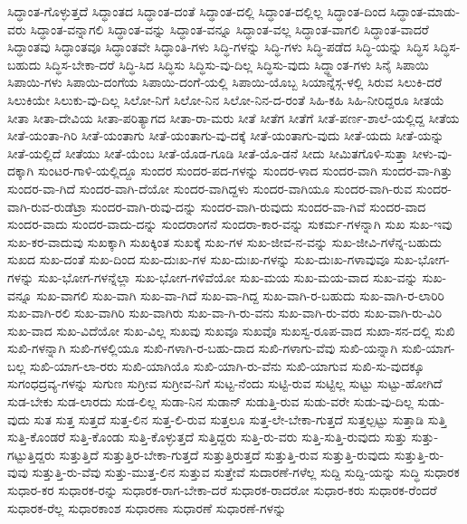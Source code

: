 {ಸಿದ್ಧಾಂತ-ಗೊಳ್ಳುತ್ತದೆ
ಸಿದ್ಧಾಂತದ
ಸಿದ್ಧಾಂತ-ದಂತೆ
ಸಿದ್ಧಾಂತ-ದಲ್ಲಿ
ಸಿದ್ಧಾಂತ-ದಲ್ಲಿಲ್ಲ
ಸಿದ್ಧಾಂತ-ದಿಂದ
ಸಿದ್ಧಾಂತ-ಮಾಡು-ವರು
ಸಿದ್ಧಾಂತ-ವನ್ನಾಗಲಿ
ಸಿದ್ಧಾಂತ-ವನ್ನು
ಸಿದ್ಧಾಂತ-ವನ್ನೂ
ಸಿದ್ಧಾಂತ-ವಲ್ಲ
ಸಿದ್ಧಾಂತ-ವಾಗಲಿ
ಸಿದ್ಧಾಂತ-ವಾದರೆ
ಸಿದ್ಧಾಂತವು
ಸಿದ್ಧಾಂತವೂ
ಸಿದ್ಧಾಂತವೇ
ಸಿದ್ಧಾಂತಿ-ಗಳು
ಸಿದ್ಧಿ-ಗಳನ್ನು
ಸಿದ್ಧಿ-ಗಳು
ಸಿದ್ಧಿ-ಪಡೆದ
ಸಿದ್ಧಿ-ಯನ್ನು
ಸಿದ್ಧಿಸ
ಸಿದ್ಧಿಸ-ಬಹುದು
ಸಿದ್ಧಿಸ-ಬೇಕಾ-ದರೆ
ಸಿದ್ಧಿ-ಸಿದ
ಸಿದ್ಧಿಸು
ಸಿದ್ಧಿಸು-ವು-ದಿಲ್ಲ
ಸಿದ್ಧಿಸು-ವುದು
ಸಿದ್ಧ್ದಾಂತ-ಗಳು
ಸಿನೈ
ಸಿಪಾಯಿ
ಸಿಪಾಯಿ-ಗಳು
ಸಿಪಾಯಿ-ದಂಗೆಯ
ಸಿಪಾಯಿ-ದಂಗೆ-ಯಲ್ಲಿ
ಸಿಪಾಯಿ-ಯೊಬ್ಬ
ಸಿಯಾನ್ನೆಸ್ಗ-ಳಲ್ಲಿ
ಸಿರುವ
ಸಿಲುಕಿ-ದರೆ
ಸಿಲುಕಿಯೇ
ಸಿಲುಕು-ವು-ದಿಲ್ಲ
ಸಿಲೋ-ನಿಗೆ
ಸಿಲೋ-ನಿನ
ಸಿಲೋ-ನಿನ-ದ-ರಂತೆ
ಸಿಹಿ-ಕಹಿ
ಸಿಹಿ-ನೀರಿದ್ದರೂ
ಸೀತಯೆ
ಸೀತಾ
ಸೀತಾ-ದೇವಿಯ
ಸೀತಾ-ಪರಿತ್ಯಾಗದ
ಸೀತಾ-ರಾ-ಮರು
ಸೀತೆ
ಸೀತೆಗ
ಸೀತೆಗೆ
ಸೀತೆ-ಪರ್ಣ-ಶಾಲೆ-ಯಲ್ಲಿದ್ದ
ಸೀತೆಯ
ಸೀತೆ-ಯಂತಾ-ಗಿರಿ
ಸೀತೆ-ಯಂತಾಗು
ಸೀತೆ-ಯಂತಾಗು-ವು-ದಕ್ಕೆ
ಸೀತೆ-ಯಂತಾಗು-ವುದು
ಸೀತೆ-ಯದು
ಸೀತೆ-ಯನ್ನು
ಸೀತೆ-ಯಲ್ಲಿದೆ
ಸೀತೆಯು
ಸೀತೆ-ಯೆಂಬ
ಸೀತೆ-ಯೊಡ-ಗೂಡಿ
ಸೀತೆ-ಯೊ-ಡನೆ
ಸೀದು
ಸೀಮಿತಗೊಳಿ-ಸುತ್ತಾ
ಸೀಳು-ವು-ದಕ್ಕಾಗಿ
ಸುಂಟರ-ಗಾಳಿ-ಯಲ್ಲಿದ್ದೂ
ಸುಂದರ
ಸುಂದರ-ಪದ-ಗಳನ್ನು
ಸುಂದರ-ಳಾದ
ಸುಂದರ-ವಾಗಿ
ಸುಂದರ-ವಾ-ಗಿತ್ತು
ಸುಂದರ-ವಾ-ಗಿದೆ
ಸುಂದರ-ವಾಗಿ-ದೆಯೋ
ಸುಂದರ-ವಾಗಿದ್ದಳು
ಸುಂದರ-ವಾಗಿಯೂ
ಸುಂದರ-ವಾಗಿ-ರುವ
ಸುಂದರ-ವಾಗಿ-ರುವ-ರುಡೆಟ್ರಾ
ಸುಂದರ-ವಾಗಿ-ರುವು-ದನ್ನು
ಸುಂದರ-ವಾಗಿ-ರುವುದು
ಸುಂದರ-ವಾ-ಗಿವೆ
ಸುಂದರ-ವಾದ
ಸುಂದರ-ವಾದು
ಸುಂದರ-ವಾದು-ದನ್ನು
ಸುಂದರಾಂಗನೆ
ಸುಂದರಾ-ಕಾರ-ವನ್ನು
ಸುಕರ್ಮ-ಗಳನ್ನಾಗಿ
ಸುಖ
ಸುಖ-ಇವು
ಸುಖ-ಕರ-ವಾದುವು
ಸುಖಕ್ಕಾಗಿ
ಸುಖಕ್ಕಿಂತ
ಸುಖಕ್ಕೆ
ಸುಖ-ಗಳ
ಸುಖ-ಜೀವ-ನ-ವನ್ನು
ಸುಖ-ಜೀವಿ-ಗಳೆನ್ನ-ಬಹುದು
ಸುಖದ
ಸುಖ-ದಂತೆ
ಸುಖ-ದಿಂದ
ಸುಖ-ದುಃಖ-ಗಳ
ಸುಖ-ದುಃಖ-ಗಳನ್ನು
ಸುಖ-ದುಃಖ-ಗಳಾವುವೂ
ಸುಖ-ಭೋಗ-ಗಳನ್ನು
ಸುಖ-ಭೋಗ-ಗಳನ್ನೆಲ್ಲಾ
ಸುಖ-ಭೋಗ-ಗಳಿವೆಯೋ
ಸುಖ-ಮಯ
ಸುಖ-ಮಯ-ವಾದ
ಸುಖ-ವನ್ನು
ಸುಖ-ವನ್ನೂ
ಸುಖ-ವಾಗಲಿ
ಸುಖ-ವಾಗಿ
ಸುಖ-ವಾ-ಗಿದೆ
ಸುಖ-ವಾ-ಗಿದ್ದ
ಸುಖ-ವಾಗಿ-ರ-ಬಹುದು
ಸುಖ-ವಾಗಿ-ರ-ಲಾರಿರಿ
ಸುಖ-ವಾಗಿ-ರಲಿ
ಸುಖ-ವಾಗಿರಿ
ಸುಖ-ವಾಗಿರು
ಸುಖ-ವಾ-ಗಿ-ರು-ವನು
ಸುಖ-ವಾಗಿ-ರು-ವರು
ಸುಖ-ವಾಗಿ-ರು-ವಿರಿ
ಸುಖ-ವಾದ
ಸುಖ-ವಿದೆಯೋ
ಸುಖ-ವಿಲ್ಲ
ಸುಖವು
ಸುಖವೂ
ಸುಖವೊ
ಸುಖಸ್ವ-ರೂಪ-ವಾದ
ಸುಖಾ-ಸನ-ದಲ್ಲಿ
ಸುಖಿ
ಸುಖಿ-ಗಳನ್ನಾಗಿ
ಸುಖಿ-ಗಳಲ್ಲಿಯೂ
ಸುಖಿ-ಗಳಾಗಿ-ರ-ಬಹು-ದಾದ
ಸುಖಿ-ಗಳಾಗು-ವೆವು
ಸುಖಿ-ಯನ್ನಾಗಿ
ಸುಖಿ-ಯಾಗ-ಬಲ್ಲ
ಸುಖಿ-ಯಾಗ-ಲಾ-ರರು
ಸುಖಿ-ಯಾಗಿಯೊ
ಸುಖಿ-ಯಾಗಿ-ರು-ವೆನು
ಸುಖಿ-ಯಾಗುವ
ಸುಖಿ-ಸು-ವುದಕ್ಕೂ
ಸುಗಂಧದ್ರವ್ಯ-ಗಳನ್ನು
ಸುಗುಣ
ಸುಗ್ರೀವ
ಸುಗ್ರೀವ-ನಿಗೆ
ಸುಟ್ಟ-ನೆಂದು
ಸುಟ್ಟಿ-ರುವ
ಸುಟ್ಟಿಲ್ಲ
ಸುಟ್ಟು
ಸುಟ್ಟು-ಹೋಗಿದೆ
ಸುಡ-ಬೇಕು
ಸುಡ-ಲಾರದು
ಸುಡ-ಲಿಲ್ಲ
ಸುಡಾ-ನಿನ
ಸುಡಾನ್
ಸುಡುತ್ತಿ-ರುವ
ಸುಡು-ವರೇ
ಸುಡು-ವು-ದಿಲ್ಲ
ಸುಡು-ವುದು
ಸುತ
ಸುತ್ತ
ಸುತ್ತದೆ
ಸುತ್ತ-ಲಿನ
ಸುತ್ತ-ಲಿ-ರುವ
ಸುತ್ತಲೂ
ಸುತ್ತ-ಲೇ-ಬೇಕಾ-ಗುತ್ತದೆ
ಸುತ್ತಲ್ಪಟ್ಟು
ಸುತ್ತಾಡಿ
ಸುತ್ತಿ
ಸುತ್ತಿ-ಕೊಂಡರೆ
ಸುತ್ತಿ-ಕೊಂಡು
ಸುತ್ತಿ-ಕೊಳ್ಳುತ್ತದೆ
ಸುತ್ತಿದ್ದರು
ಸುತ್ತಿ-ರು-ವರು
ಸುತ್ತಿ-ಸುತ್ತಿ-ರುವುದು
ಸುತ್ತು
ಸುತ್ತು-ಗಟ್ಟುತ್ತಿದ್ದರು
ಸುತ್ತುತ್ತಿದೆ
ಸುತ್ತುತ್ತಿರ-ಬೇಕಾ-ಗುತ್ತದೆ
ಸುತ್ತುತ್ತಿರುತ್ತದೆ
ಸುತ್ತುತ್ತಿ-ರುವ
ಸುತ್ತುತ್ತಿ-ರುವುದು
ಸುತ್ತುತ್ತಿ-ರು-ವುವು
ಸುತ್ತುತ್ತಿ-ರು-ವೆವು
ಸುತ್ತು-ಮುತ್ತ-ಲಿನ
ಸುತ್ತುವ
ಸುತ್ತೇವೆ
ಸುದಾರಣೆ-ಗಳೆಲ್ಲ
ಸುದ್ದಿ
ಸುದ್ದಿ-ಯನ್ನು
ಸುದ್ಧಿ
ಸುಧಾರಕ
ಸುಧಾರ-ಕರ
ಸುಧಾರಕ-ರನ್ನು
ಸುಧಾರಕ-ರಾಗ-ಬೇಕಾ-ದರೆ
ಸುಧಾರಕ-ರಾದರೋ
ಸುಧಾರ-ಕರು
ಸುಧಾರಕ-ರೆಂದರೆ
ಸುಧಾರಕ-ರೆಲ್ಲ
ಸುಧಾರಕಾಂಶ
ಸುಧಾರಣಾ
ಸುಧಾರಣೆ
ಸುಧಾರಣೆ-ಗಳನ್ನು
}
